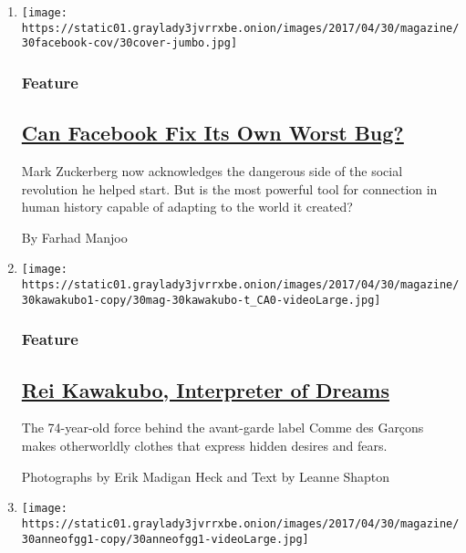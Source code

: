 \begin{enumerate}
\def\labelenumi{\arabic{enumi}.}
\item
  \texttt{[image: https://static01.graylady3jvrrxbe.onion/images/2017/04/30/magazine/30facebook-cov/30cover-jumbo.jpg]}

  \hypertarget{feature}{%
  \subsubsection{Feature}\label{feature}}

  \hypertarget{can-facebook-fix-its-own-worst-bug}{%
  \subsection{\texorpdfstring{\href{/2017/04/25/magazine/can-facebook-fix-its-own-worst-bug.html}{Can
  Facebook Fix Its Own Worst
  Bug?}}{Can Facebook Fix Its Own Worst Bug?}}\label{can-facebook-fix-its-own-worst-bug}}

  Mark Zuckerberg now acknowledges the dangerous side of the social
  revolution he helped start. But is the most powerful tool for
  connection in human history capable of adapting to the world it
  created?

  By Farhad Manjoo
\item
  \texttt{[image: https://static01.graylady3jvrrxbe.onion/images/2017/04/30/magazine/30kawakubo1-copy/30mag-30kawakubo-t\_CA0-videoLarge.jpg]}

  \hypertarget{feature-1}{%
  \subsubsection{Feature}\label{feature-1}}

  \hypertarget{rei-kawakubo-interpreter-of-dreams}{%
  \subsection{\texorpdfstring{\href{/2017/04/26/magazine/rei-kawakubo-interpreter-of-dreams.html}{Rei
  Kawakubo, Interpreter of
  Dreams}}{Rei Kawakubo, Interpreter of Dreams}}\label{rei-kawakubo-interpreter-of-dreams}}

  The 74-year-old force behind the avant-garde label Comme des Garçons
  makes otherworldly clothes that express hidden desires and fears.

  Photographs by Erik Madigan Heck and Text by Leanne Shapton
\item
  \texttt{[image: https://static01.graylady3jvrrxbe.onion/images/2017/04/30/magazine/30anneofgg1-copy/30anneofgg1-videoLarge.jpg]}


\end{enumerate}
